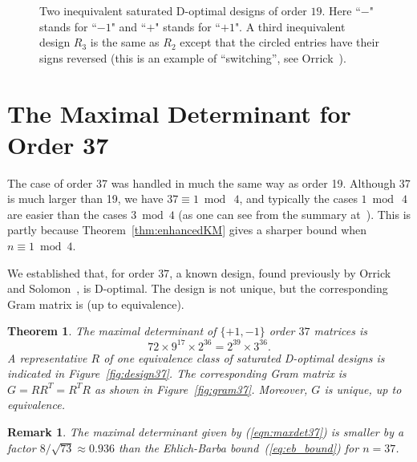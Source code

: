 \documentclass[11pt,a4paper]{article}
\newtheorem{theorem}{Theorem}
\newtheorem{remark}{Remark}
\begin{document}
\begin{center}
\begin{figure}[htbp]


\caption{Two inequivalent saturated D-optimal designs of order $19$.  Here ``$-$" stands for ``$-1$" and ``$+$" stands for ``$+1$".
A third inequivalent design $R_3$ is the same as $R_2$ except 
that the circled entries 
have their signs reversed (this is an example of ``switching'', 
see Orrick~\cite{Orrick08a}).}
\label{fig:designs19}
\end{figure}
\end{center}

\section{The Maximal Determinant for Order 37}	\label{sec:order37}

The case of order 37 was handled in much the same way as order 19. Although
37 is much larger than 19, we have $37 \equiv 1 \bmod\ 4$, and typically
the cases $1 \bmod\ 4$ are easier than the cases $3 \bmod 4$ (as one can
see from the summary at~\cite{maxdet}). This is partly because 
Theorem~\ref{thm:enhancedKM} gives a sharper bound when $n \equiv 1 \bmod 4$.
 
We established that, for order $37$,
a known design, found previously by Orrick and Solomon~\cite{OrSo07},
is D-optimal. The design is not unique, but the corresponding 
Gram matrix is (up to equivalence).

\begin{theorem} \label{thm:37}
The maximal determinant of $\{+1, -1\}$ order $37$ matrices  is
\begin{equation} \label{eqn:maxdet37}
72 \times 9^{17} \times 2^{36} = 2^{39} \times 3^{36}.
\end{equation}
A representative $R$ of one equivalence class 
of saturated D-optimal designs is
indicated in Figure~\ref{fig:design37}.
The corresponding Gram matrix is
$G = RR^T = R^T R$ as shown in Figure~\ref{fig:gram37}.
Moreover, $G$ is unique, up to equivalence.
\end{theorem}

\begin{remark} The maximal determinant given by {\rm(\ref{eqn:maxdet37})} 
is smaller by a factor $8/\sqrt{73} \approx 0.936$
than the Ehlich-Barba bound~{\rm(\ref{eq:eb_bound})}
for $n=37$.
\end{remark}
\end{document}
